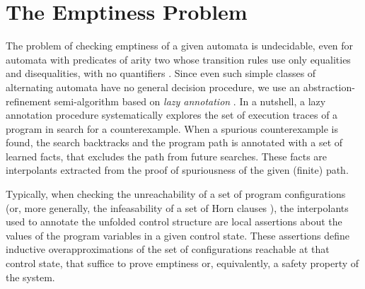 \documentclass{llncs}
\begin{document}
\section{The Emptiness Problem}
\label{sec:emptiness}

The problem of checking emptiness of a given automata is undecidable,
even for automata with predicates of arity two whose transition rules
use only equalities and disequalities, with no quantifiers
\cite{Farzan15}. Since even such simple classes of alternating
automata have no general decision procedure, we use an
abstraction-refinement semi-algorithm based on \emph{lazy annotation}
\cite{McMillan06,McMillan14}. In a nutshell, a lazy annotation
procedure systematically explores the set of execution traces of a
program in search for a counterexample. When a spurious counterexample
is found, the search backtracks and the program path is annotated with
a set of learned facts, that excludes the path from future
searches. These facts are interpolants extracted from the proof of
spuriousness of the given (finite) path.

Typically, when checking the unreachability of a set of program
configurations (or, more generally, the infeasability of a set of Horn
clauses \cite{BjornerGurfinkelMcMillanRybalchenko15}), the
interpolants used to annotate the unfolded control structure are local
assertions about the values of the program variables in a given
control state. These assertions define inductive overapproximations of
the set of configurations reachable at that control state, that
suffice to prove emptiness or, equivalently, a safety property of the
system.
\end{document}
